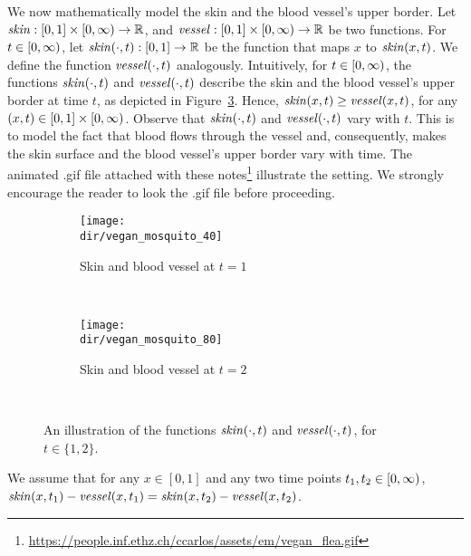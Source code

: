 We now mathematically model the skin and the blood vessel's upper border.
Let $\mathit{skin} : [0, 1] \times [0, \infty) \to \mathbb{R}$, and $\mathit{vessel} : [0, 1] \times [0, \infty) \to \mathbb{R}$ be two functions. For $t \in [0, \infty)$, let $\mathit{skin}(\cdot, t) : [0, 1] \to \mathbb{R}$ be the function that maps $x$ to $\mathit{skin}(x, t)$. We define the function $\mathit{vessel}(\cdot, t)$ analogously. Intuitively, for $t \in [0, \infty)$, the functions $\mathit{skin}(\cdot, t)$ and $\mathit{vessel}(\cdot, t)$ describe the skin and the blood vessel's upper border at time $t$, as depicted in Figure~\ref{fig:skin_vessel}. Hence, $\mathit{skin}(x, t) \geq \mathit{vessel}(x, t)$, for any $(x, t) \in [0, 1] \times [0, \infty)$. 
Observe that $\mathit{skin}(\cdot, t)$ and $\mathit{vessel}(\cdot, t)$ vary with $t$. This is to model the fact that blood flows through the vessel and, consequently, makes the skin surface and the blood vessel's upper border vary with time. The animated .gif file attached with these notes\footnote{\url{https://people.inf.ethz.ch/ccarlos/assets/em/vegan\_flea.gif}} illustrate the setting. We strongly encourage the reader to look the .gif file before proceeding.

\begin{figure}
    \centering
    \begin{subfigure}[b]{0.8\textwidth}
        \texttt{[image: \\dir/vegan\_mosquito\_40]}
        \caption{Skin and blood vessel at $t = 1$}
        \label{fig:skin_vessel_t0}
    \end{subfigure}
    ~ %
      
    \begin{subfigure}[b]{0.8\textwidth}
        \texttt{[image: \\dir/vegan\_mosquito\_80]}
        \caption{Skin and blood vessel at $t = 2$}
        \label{fig:skin_vessel_t1}
    \end{subfigure}
    ~ %
    \caption{An illustration of the functions $\mathit{skin}(\cdot, t)$ and $\mathit{vessel}(\cdot, t)$, for $t \in \{1, 2\}$.}\label{fig:skin_vessel}
\end{figure}

\begin{assumption}
We assume that for any $x \in [0, 1]$ and any two time points $t_1, t_2 \in [0, \infty)$, $\mathit{skin}(x, t_1) - \mathit{vessel}(x, t_1) = \mathit{skin}(x, t_2) - \mathit{vessel}(x, t_2)$. 
\label{asm:unelastic_skin}
\end{assumption}

